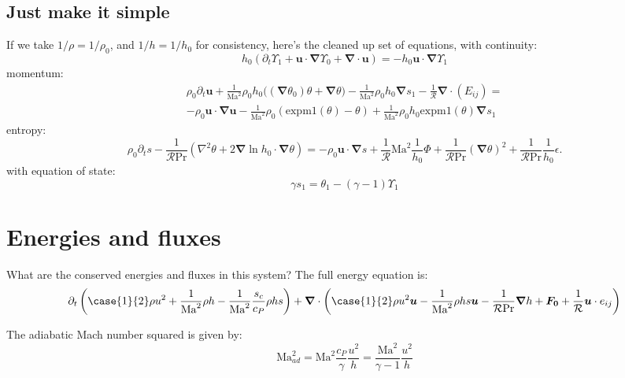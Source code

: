 \documentclass{aastex631}
\newcommand{\del}{\nabla}
\renewcommand{\vec}{\boldsymbol}
\newcommand{\grad}{\vec{\del}}
\newcommand{\scrR}{\mathcal{R}}
\newcommand{\Ma}{\mathrm{Ma}}
\renewcommand{\Pr}{\mathrm{Pr}}
\newcommand{\expm}{\mathrm{expm1}}
\begin{document}
\subsection{Just make it simple}
If we take $1/\rho = 1/\rho_0$, and $1/h = 1/h_0$ for consistency, here's the cleaned up set of equations, with continuity:
\begin{equation}
    h_0 \left(\partial_t \Upsilon_1 + \vec{u}\cdot\grad \Upsilon_0 + \grad \cdot \vec{u}\right) = - h_0 \vec{u}\cdot\grad \Upsilon_1
\end{equation}
momentum:
\begin{multline}
  \rho_0 \partial_t \vec{u}
  + \frac{1}{\Ma^2}\rho_0 h_0 \Bigg((\grad \theta_0)\theta  + \grad \theta \Bigg)
  - \frac{1}{\Ma^2} \rho_0 h_0 \grad s_1
  - \frac{1}{\scrR}\grad \cdot (E_{ij})
  = \\
  -\rho_0 \vec{u}\cdot\grad\vec{u}
  -\frac{1}{\Ma^2} \rho_0 \left(\expm(\theta)-\theta\right)
  + \frac{1}{\Ma^2} \rho_0 h_0 \expm(\theta) \grad s_1
\end{multline}
entropy:
\begin{equation}
  \rho_0 \partial_t s
  - \frac{1}{\scrR \Pr}\left(\nabla^2 \theta + 2 \grad \ln h_0 \cdot \grad \theta \right)
  =
  - \rho_0 \vec{u}\cdot\grad s
  + \frac{1}{\scrR} \Ma^2  \frac{1}{h_0} \Phi
  + \frac{1}{\scrR \Pr} (\grad \theta)^2
  + \frac{1}{\scrR \Pr} \frac{1}{h_0} \epsilon.
\end{equation}
with equation of state:
\begin{equation}
  \gamma s_1 = \theta_1 - (\gamma - 1)\Upsilon_1
\end{equation}


\section{Energies and fluxes}
What are the conserved energies and fluxes in this system?  The full energy equation is:
\begin{align}
  \partial_t \left(\case{1}{2} \rho u^2 + \frac{1}{\Ma^2} \rho h - \frac{1}{\Ma^2}\frac{s_c}{c_P} \rho h s \right)
  + \grad \cdot \left(\case{1}{2} \rho u^2 \vec{u} - \frac{1}{\Ma^2}\rho h s \vec{u} - \frac{1}{\scrR \Pr} \grad h + \vec{F_0} + \frac{1}{\scrR} \vec{u}\cdot e_{ij} \right)
\end{align}

The adiabatic Mach number squared is given by:
\begin{equation}
  \Ma^2_{ad}
  = \Ma^2\frac{c_P}{\gamma}\frac{u^2}{h}
  = \frac{\Ma^2}{\gamma-1}\frac{u^2}{h}
\end{equation}
\end{document}
